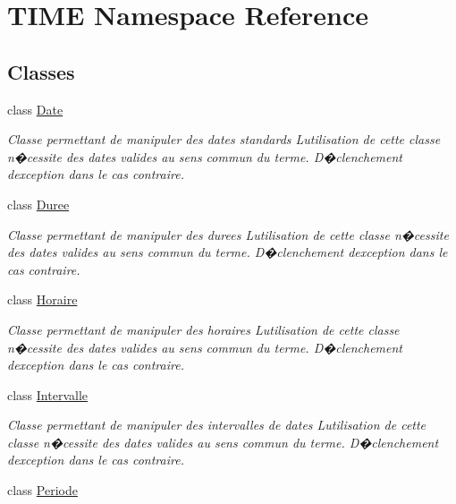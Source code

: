\hypertarget{namespace_t_i_m_e}{}\section{T\+I\+M\+E Namespace Reference}
\label{namespace_t_i_m_e}
\subsection*{Classes}
\begin{DoxyCompactItemize}
\item 
class \hyperlink{class_t_i_m_e_1_1_date}{Date}
\begin{DoxyCompactList}\small\item\em Classe permettant de manipuler des dates standards L\textquotesingle{}utilisation de cette classe n�cessite des dates valides au sens commun du terme. D�clenchement d\textquotesingle{}exception dans le cas contraire. \end{DoxyCompactList}\item 
class \hyperlink{class_t_i_m_e_1_1_duree}{Duree}
\begin{DoxyCompactList}\small\item\em Classe permettant de manipuler des durees L\textquotesingle{}utilisation de cette classe n�cessite des dates valides au sens commun du terme. D�clenchement d\textquotesingle{}exception dans le cas contraire. \end{DoxyCompactList}\item 
class \hyperlink{class_t_i_m_e_1_1_horaire}{Horaire}
\begin{DoxyCompactList}\small\item\em Classe permettant de manipuler des horaires L\textquotesingle{}utilisation de cette classe n�cessite des dates valides au sens commun du terme. D�clenchement d\textquotesingle{}exception dans le cas contraire. \end{DoxyCompactList}\item 
class \hyperlink{class_t_i_m_e_1_1_intervalle}{Intervalle}
\begin{DoxyCompactList}\small\item\em Classe permettant de manipuler des intervalles de dates L\textquotesingle{}utilisation de cette classe n�cessite des dates valides au sens commun du terme. D�clenchement d\textquotesingle{}exception dans le cas contraire. \end{DoxyCompactList}\item 
class \hyperlink{class_t_i_m_e_1_1_periode}{Periode}

\end{DoxyCompactItemize}

